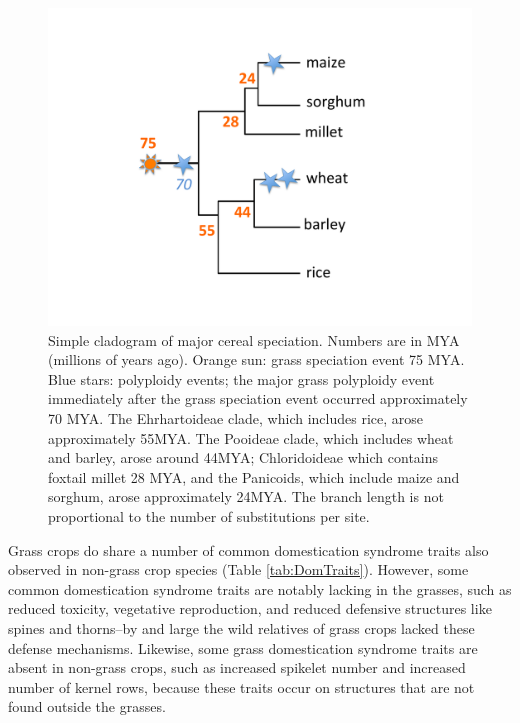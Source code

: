 \documentclass[12pt]{article}
\begin{document}
\begin{figure}[h]
    \centering
    \includegraphics[width=15cm]{Figure_1.pdf}
    \caption{Simple cladogram of major cereal speciation. Numbers are in MYA (millions of years ago).
Orange sun: grass speciation event 75 MYA.  Blue stars: polyploidy events; 
the major grass polyploidy event immediately after the grass speciation event occurred 
approximately 70 MYA. The Ehrhartoideae clade, which includes rice, arose 
approximately 55MYA. The Pooideae clade, which includes wheat and barley, 
arose around 44MYA; Chloridoideae which contains foxtail millet 28 MYA, and the Panicoids, 
which include maize and sorghum, arose approximately 24MYA. The branch length is not 
proportional to the number of substitutions per site.
}
    \label{fig:grassphylo}
\end{figure}

Grass crops do share a number of common domestication syndrome traits also observed in non-grass crop species (Table \ref{tab:DomTraits}).
However, some common domestication syndrome traits are notably lacking in the grasses, such as reduced toxicity, vegetative reproduction, and reduced defensive structures like spines and thorns--by and large the wild relatives of grass crops lacked these defense mechanisms.
Likewise, some grass domestication syndrome traits are absent in non-grass crops, such as increased spikelet number and increased number of kernel rows, because these traits occur on structures that are not found outside the grasses.  
\end{document}
